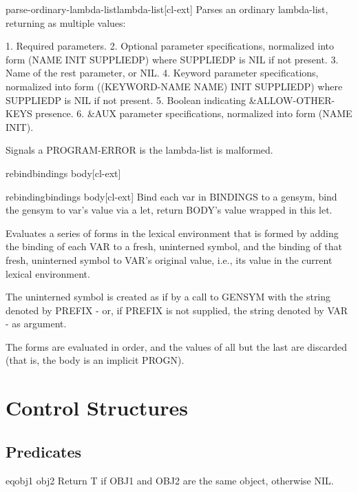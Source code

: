 \documentclass[10pt,english]{book}
\begin{document}
\begin{function}{parse-ordinary-lambda-list}{lambda-list}[cl-ext]
  Parses an ordinary lambda-list, returning as multiple values:

 1. Required parameters.
 2. Optional parameter specifications, normalized into form (NAME INIT SUPPLIEDP)
    where SUPPLIEDP is NIL if not present.
 3. Name of the rest parameter, or NIL.
 4. Keyword parameter specifications, normalized into form ((KEYWORD-NAME NAME) INIT SUPPLIEDP)
    where SUPPLIEDP is NIL if not present.
 5. Boolean indicating \&ALLOW-OTHER-KEYS presence.
 6. \&AUX parameter specifications, normalized into form (NAME INIT).

Signals a PROGRAM-ERROR is the lambda-list is malformed.
\end{function}

\begin{macro}{rebind}{bindings \body body}[cl-ext]
  
\end{macro}

\begin{macro}{rebinding}{bindings \body body}[cl-ext]
  Bind each var in BINDINGS to a gensym, bind the gensym to
var's value via a let, return BODY's value wrapped in this let.

Evaluates a series of forms in the lexical environment that is
formed by adding the binding of each VAR to a fresh, uninterned
symbol, and the binding of that fresh, uninterned symbol to VAR's
original value, i.e., its value in the current lexical
environment.

The uninterned symbol is created as if by a call to GENSYM with the
string denoted by PREFIX - or, if PREFIX is not supplied, the string
denoted by VAR - as argument.

The forms are evaluated in order, and the values of all but the last
are discarded (that is, the body is an implicit PROGN).
\end{macro}


\chapter{Control Structures}
\label{cha:control-structures}

\section{Predicates}
\label{sec:control-predicates}

\begin{function}{eq}{obj1 obj2}
  Return T if OBJ1 and OBJ2 are the same object, otherwise NIL.
\end{function}
\end{document}
